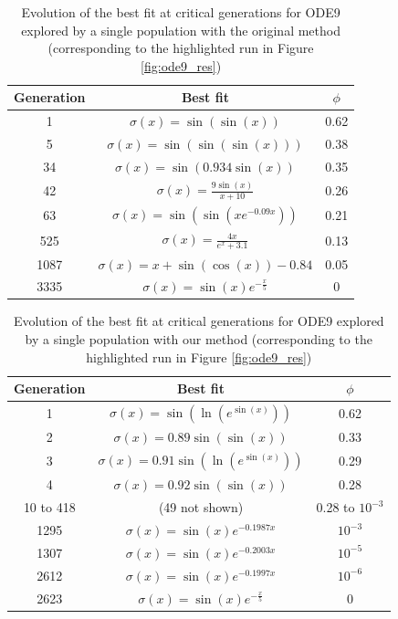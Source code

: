 \documentclass[aps,reprint,superscriptaddress,nofootinbib]{revtex4-2}
\begin{document}
    \begin{table}[htp]
        \centering
        \caption{Evolution of the best fit at critical generations for ODE9 explored by a single population with the original method (corresponding to the highlighted run in Figure \ref{fig:ode9_res})}
        \begin{tabular}{c|c|c}
            Generation & Best fit & \(\phi\)
            \\
            \hline
            1 & \(\sigma(x) = \sin(\sin(x))\) & 0.62
            \\
            5 & \(\sigma(x) = \sin(\sin(\sin(x)))\) & 0.38
            \\
            34 & \(\sigma(x) = \sin(0.934\sin(x))\) & 0.35
            \\
            42 & \(\sigma(x) = \frac{9\sin(x)}{x+10}\) & 0.26
            \\
            63 & \(\sigma(x) = \sin(\sin(xe^{-0.09x}))\) & 0.21
            \\
            525 & \(\sigma(x) = \frac{4x}{e^x + 3.1}\) & 0.13
            \\
            1087 & \(\sigma(x) = x + \sin(\cos(x)) - 0.84\) & 0.05
            \\
            3335 & \(\sigma(x) = \sin(x)e^{-\frac{x}{5}}\) & 0
        \end{tabular}
        \label{tab:ode9_orig_generations}
    \end{table}
    \begin{table}[htp]
        \centering
        \caption{Evolution of the best fit at critical generations for ODE9 explored by a single population with our method (corresponding to the highlighted run in Figure \ref{fig:ode9_res})}
        \begin{tabular}{c|c|c}
            Generation & Best fit & \(\phi\)
            \\
            \hline
            1 & \(\sigma(x) = \sin(\ln(e^{\sin(x)}))\) & 0.62
            \\
            2 & \(\sigma(x) = 0.89\sin(\sin(x))\) & 0.33
            \\
            3 & \(\sigma(x) = 0.91\sin(\ln(e^{\sin(x)}))\) & 0.29
            \\
            4 & \(\sigma(x) = 0.92\sin(\sin(x))\) & 0.28
            \\
            10 to 418 &(49 not shown)& 0.28 to \(10^{-3}\)
            \\
            1295 & \(\sigma(x) = \sin(x)e^{-0.1987x}\) & \(10^{-3}\)
            \\
            1307 & \(\sigma(x) =\sin(x)e^{-0.2003x} \) & \(10^{-5}\)
            \\
            2612 & \(\sigma(x) = \sin(x)e^{-0.1997x}\) & \(10^{-6}\)
            \\
            2623 & \(\sigma(x) = \sin(x)e^{-\frac{x}{5}}\) & 0
        \end{tabular}
        \label{tab:ode9_ours_generations}
    \end{table}
    
\end{document}
